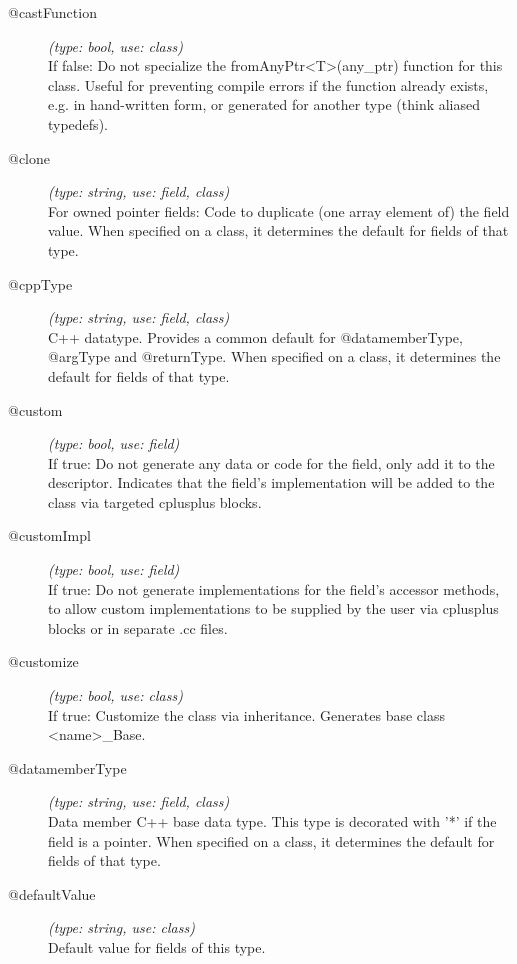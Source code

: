 \begin{description}
\item[@castFunction] \textit{(type: bool, use: class)} \\
  If false: Do not specialize the fromAnyPtr<T>(any\_ptr) function for this
  class. Useful for preventing compile errors if the function already exists,
  e.g. in hand-written form, or generated for another type (think aliased
  typedefs).

\item[@clone] \textit{(type: string, use: field, class)} \\
  For owned pointer fields: Code to duplicate (one array element of) the field
  value. When specified on a class, it determines the default for fields of
  that type.

\item[@cppType] \textit{(type: string, use: field, class)} \\
  C++ datatype. Provides a common default for @datamemberType, @argType and
  @returnType. When specified on a class, it determines the default for fields
  of that type.

\item[@custom] \textit{(type: bool, use: field)} \\
  If true: Do not generate any data or code for the field, only add it to the
  descriptor. Indicates that the field's implementation will be added to the
  class via targeted cplusplus blocks.

\item[@customImpl] \textit{(type: bool, use: field)} \\
  If true: Do not generate implementations for the field's accessor methods,
  to allow custom implementations to be supplied by the user via cplusplus
  blocks or in separate .cc files.

\item[@customize] \textit{(type: bool, use: class)} \\
  If true: Customize the class via inheritance. Generates base class
  <name>\_Base.

\item[@datamemberType] \textit{(type: string, use: field, class)} \\
  Data member C++ base data type. This type is decorated with '*' if the field
  is a pointer. When specified on a class, it determines the default for
  fields of that type.

\item[@defaultValue] \textit{(type: string, use: class)} \\
  Default value for fields of this type.


\end{description}
